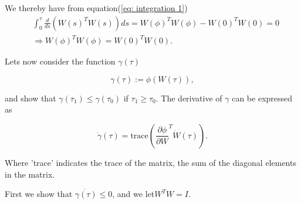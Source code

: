  We thereby have from equation(\ref{eq: integration 1})
 \begin{equation}
 \label{eq: Verifiy 1}
 \begin{split}
 &\int _{0}^{\tau} \frac{d}{ds} (W(s)^{T}W(s)) ds = W(\phi)^{T}W(\phi) - W(0)^{T}W(0) = 0 \\
 &\Longrightarrow W(\phi)^{T}W(\phi) = W(0)^{T}W(0).
\end{split} 
 \end{equation}
 
 Lets now consider the function $\gamma(\tau)$
 
 \begin{equation}
 \label{eq: gamma}
 \gamma(\tau):=\phi(W(\tau)),
 \end{equation}
 
 and show that $\gamma(\tau_1) \leq \gamma(\tau_0)$ if $\tau_1 \geq \tau_0$. The derivative of $\gamma$ can be expressed as
 
 \begin{equation}
 \label{eq: div gamma}
 \dot{\gamma}(\tau)=\text{trace}(\frac{\partial \phi}{\partial W}^{T} \dot{W}(\tau)).
 \end{equation}
 
 Where 'trace' indicates the trace of the matrix, the sum of the diagonal elements in the matrix.
 
 First we show that $\dot{\gamma(\tau)}\leq 0$, and we let$W^{T}W=I$.
 

